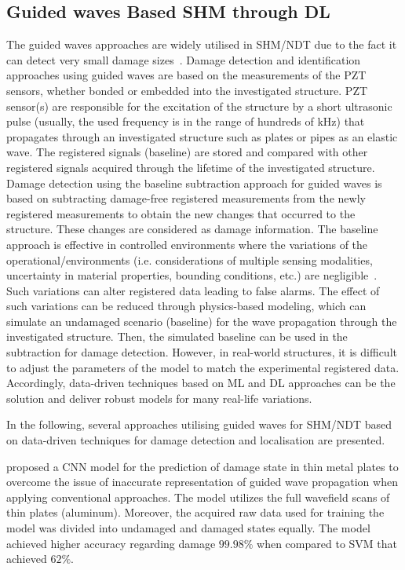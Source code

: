 \subsection{Guided waves Based SHM through DL}
The guided waves approaches are widely utilised in SHM/NDT due to the fact it can detect very small damage sizes~\cite{Guemes2020}. 
Damage detection and identification approaches using guided waves are based on the measurements of the PZT sensors, whether bonded or embedded into the investigated structure. 
PZT sensor(s) are responsible for the excitation of the structure by a short ultrasonic pulse (usually, the used frequency is in the range of hundreds of kHz) that propagates through an investigated structure such as plates or pipes as an elastic wave.
The registered signals (baseline) are stored and compared with other registered signals acquired through the lifetime of the investigated structure.
Damage detection using the baseline subtraction approach for guided waves is based on subtracting damage-free registered measurements from the newly registered measurements to obtain the new changes that occurred to the structure.
These changes are considered as damage information.
The baseline approach is effective in controlled environments where the variations of the operational/environments (i.e. considerations of multiple sensing modalities, uncertainty in material properties, bounding conditions, etc.) are negligible~\cite{Yuan2020}.  
Such variations can alter registered data leading to false alarms.
The effect of such variations can be reduced through physics-based modeling, which can simulate an undamaged scenario (baseline) for the wave propagation through the investigated structure.
Then, the simulated baseline can be used in the subtraction for damage detection.
However, in real-world structures, it is difficult to adjust the parameters of the model to match the experimental registered data.
Accordingly, data-driven techniques based on ML and DL approaches can be the solution and deliver robust models for many real-life variations.

In the following, several approaches utilising guided waves for SHM/NDT based on data-driven techniques for damage detection and localisation are presented.

\textcite{Melville1949} proposed a CNN model for the prediction of damage state in thin metal plates to overcome the issue of inaccurate representation of guided wave propagation when applying conventional approaches. 
The model utilizes the full wavefield scans of thin plates (aluminum).
Moreover, the acquired raw data used for training the model was divided into undamaged and damaged states equally.
The model achieved higher accuracy regarding damage  \(99.98\%\) when compared to SVM that achieved \(62\%\).

